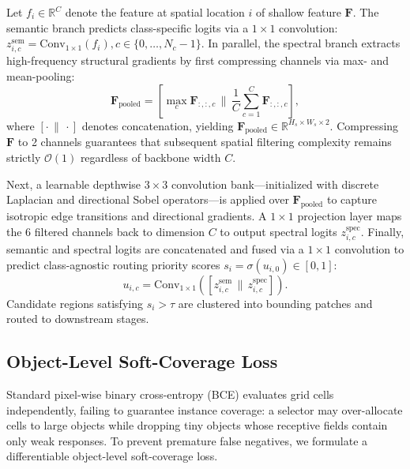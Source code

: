 Let $f_i \in \mathbb{R}^C$ denote the feature at spatial location $i$ of shallow feature $\mathbf{F}$. The semantic branch predicts class-specific logits via a $1\times 1$ convolution: $z^{\mathrm{sem}}_{i,c} = \mathrm{Conv}_{1\times 1}(f_i), c \in \{0, \dots, N_c - 1\}$. In parallel, the spectral branch extracts high-frequency structural gradients by first compressing channels via max- and mean-pooling:
\begin{equation}
\mathbf{F}_{\mathrm{pooled}} = \left[ \max_c \mathbf{F}_{:,:,c} \,\|\, \frac{1}{C}\sum_{c=1}^C \mathbf{F}_{:,:,c} \right],
\label{eq:channel_pool}
\end{equation}
where $[\cdot \,\|\, \cdot]$ denotes concatenation, yielding $\mathbf{F}_{\mathrm{pooled}} \in \mathbb{R}^{H_s \times W_s \times 2}$. Compressing $\mathbf{F}$ to 2 channels guarantees that subsequent spatial filtering complexity remains strictly $\mathcal{O}(1)$ regardless of backbone width $C$. 

Next, a learnable depthwise $3\times 3$ convolution bank—initialized with discrete Laplacian and directional Sobel operators—is applied over $\mathbf{F}_{\mathrm{pooled}}$ to capture isotropic edge transitions and directional gradients. A $1\times 1$ projection layer maps the 6 filtered channels back to dimension $C$ to output spectral logits $z^{\mathrm{spec}}_{i,c}$. Finally, semantic and spectral logits are concatenated and fused via a $1\times 1$ convolution to predict class-agnostic routing priority scores $s_i = \sigma(u_{i,0}) \in [0, 1]$:
\begin{equation}
u_{i,c} = \mathrm{Conv}_{1\times 1}\!\left(\left[ z^{\mathrm{sem}}_{i,c} \,\|\, z^{\mathrm{spec}}_{i,c} \right]\right).
\label{eq:fusion}
\end{equation}
Candidate regions satisfying $s_i > \tau$ are clustered into bounding patches and routed to downstream stages.

\subsection{Object-Level Soft-Coverage Loss}
\label{ssec:coverage}

Standard pixel-wise binary cross-entropy (BCE) evaluates grid cells independently, failing to guarantee instance coverage: a selector may over-allocate cells to large objects while dropping tiny objects whose receptive fields contain only weak responses. To prevent premature false negatives, we formulate a differentiable object-level soft-coverage loss.

